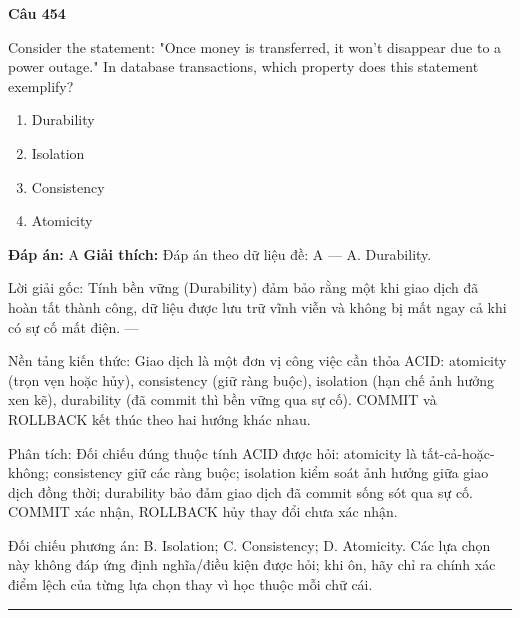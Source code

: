 \documentclass[11pt,a4paper]{article}
\newenvironment{question}[1]{%
  \par\vspace{1em}\noindent\textbf{\large Câu #1}\par\vspace{0.4em}
}{%
  \par\vspace{1em}\hrule\vspace{0.6em}
}
\newenvironment{choices}{%
  \begin{enumerate}[label=\textbf{\Alph*.},leftmargin=2.2em,itemsep=2pt,topsep=3pt]
}{%
  \end{enumerate}
}
\newcommand{\choice}{\item}
\begin{document}
\begin{question}{454}
Consider the statement: "Once money is transferred, it won't disappear due to a power outage." In database transactions, which property does this statement exemplify?
\begin{choices}
\choice Durability
\choice Isolation
\choice Consistency
\choice Atomicity
\end{choices}
\textbf{Đáp án:} A
\textbf{Giải thích:} Đáp án theo dữ liệu đề: A — A. Durability.

Lời giải gốc: Tính bền vững (Durability) đảm bảo rằng một khi giao dịch đã hoàn tất thành công, dữ liệu được lưu trữ vĩnh viễn và không bị mất ngay cả khi có sự cố mất điện. ---

Nền tảng kiến thức: Giao dịch là một đơn vị công việc cần thỏa ACID: atomicity (trọn vẹn hoặc hủy), consistency (giữ ràng buộc), isolation (hạn chế ảnh hưởng xen kẽ), durability (đã commit thì bền vững qua sự cố). COMMIT và ROLLBACK kết thúc theo hai hướng khác nhau.

Phân tích: Đối chiếu đúng thuộc tính ACID được hỏi: atomicity là tất-cả-hoặc-không; consistency giữ các ràng buộc; isolation kiểm soát ảnh hưởng giữa giao dịch đồng thời; durability bảo đảm giao dịch đã commit sống sót qua sự cố. COMMIT xác nhận, ROLLBACK hủy thay đổi chưa xác nhận.

Đối chiếu phương án: B. Isolation; C. Consistency; D. Atomicity. Các lựa chọn này không đáp ứng định nghĩa/điều kiện được hỏi; khi ôn, hãy chỉ ra chính xác điểm lệch của từng lựa chọn thay vì học thuộc mỗi chữ cái.
\end{question}
\end{document}
